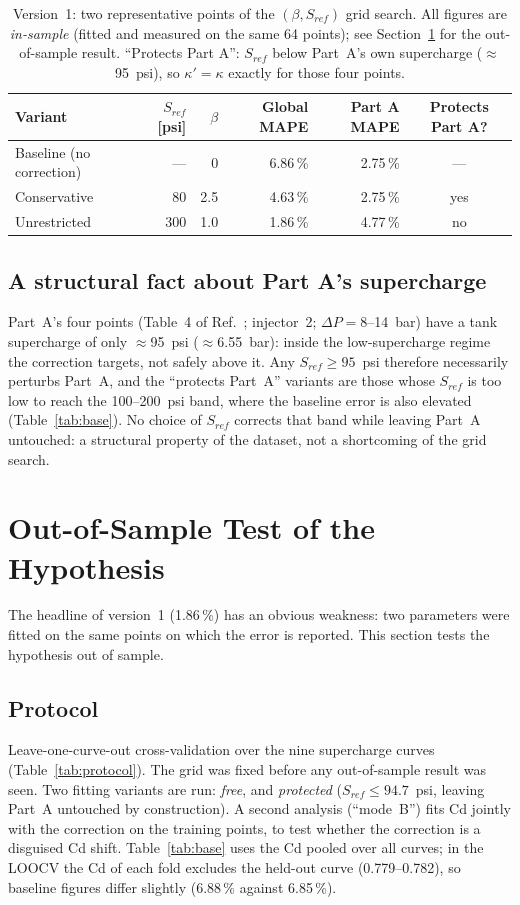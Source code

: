 \documentclass[11pt,a4paper]{article}
\begin{document}
\begin{table}[!htbp]
\centering\small
\caption{Version~1: two representative points of the $(\beta,S_{ref})$ grid search. All figures are \emph{in-sample} (fitted and measured on the same 64 points); see Section~\ref{sec:loocv} for the out-of-sample result. ``Protects Part A'': $S_{ref}$ below Part~A's own supercharge ($\approx$95~psi), so $\kappa'=\kappa$ exactly for those four points.}
\label{tab:grid}
\begin{tabular}{lrrrrc}\toprule
Variant & $S_{ref}$ [psi] & $\beta$ & Global MAPE & Part A MAPE & Protects Part A?\\\midrule
Baseline (no correction) & --- & 0 & 6.86\,\% & 2.75\,\% & ---\\
Conservative & 80 & 2.5 & 4.63\,\% & 2.75\,\% & yes\\
Unrestricted & 300 & 1.0 & 1.86\,\% & 4.77\,\% & no\\\bottomrule
\end{tabular}
\end{table}

\subsection{A structural fact about Part A's supercharge}
Part~A's four points (Table~4 of Ref.~\cite{nino2019}; injector~2; $\Delta P=8$--14~bar) have a tank supercharge of only $\approx$95~psi ($\approx$6.55~bar): inside the low-supercharge regime the correction targets, not safely above it. Any $S_{ref}\geq95$~psi therefore necessarily perturbs Part~A, and the ``protects Part~A'' variants are those whose $S_{ref}$ is too low to reach the 100--200~psi band, where the baseline error is also elevated (Table~\ref{tab:base}). No choice of $S_{ref}$ corrects that band while leaving Part~A untouched: a structural property of the dataset, not a shortcoming of the grid search.

\section{Out-of-Sample Test of the Hypothesis}\label{sec:loocv}
The headline of version~1 (1.86\,\%) has an obvious weakness: two parameters were fitted on the same points on which the error is reported. This section tests the hypothesis out of sample.

\subsection{Protocol}
Leave-one-curve-out cross-validation over the nine supercharge curves (Table~\ref{tab:protocol}). The grid was fixed before any out-of-sample result was seen. Two fitting variants are run: \emph{free}, and \emph{protected} ($S_{ref}\leq94.7$~psi, leaving Part~A untouched by construction). A second analysis (``mode~B'') fits Cd jointly with the correction on the training points, to test whether the correction is a disguised Cd shift. Table~\ref{tab:base} uses the Cd pooled over all curves; in the LOOCV the Cd of each fold excludes the held-out curve (0.779--0.782), so baseline figures differ slightly (6.88\,\% against 6.85\,\%).
\end{document}
